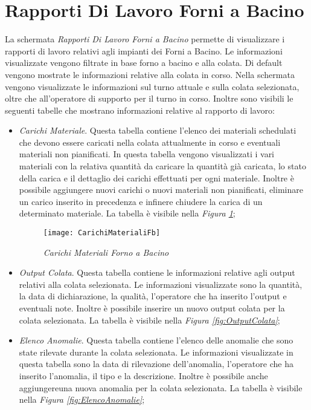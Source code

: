   \section{Rapporti Di Lavoro Forni a Bacino}
  La schermata \textit{Rapporti Di Lavoro Forni a Bacino} permette di visualizzare
  i rapporti di lavoro relativi agli impianti dei Forni a Bacino. Le informazioni visualizzate vengono filtrate in base 
  forno a bacino e alla colata. Di default vengono mostrate le informazioni relative alla colata in corso.
  Nella schermata vengono visualizzate le informazioni sul turno attuale e sulla colata selezionata, oltre che all'operatore
  di supporto per il turno in corso. Inoltre sono visibili le seguenti tabelle che mostrano informazioni relative al 
  rapporto di lavoro:
  \begin{itemize}
    \item \textit{Carichi Materiale}. Questa tabella contiene l'elenco dei materiali schedulati che devono essere caricati nella
    colata attualmente in corso e eventuali materiali non pianificati. In questa tabella vengono visualizzati i vari materiali
    con la relativa quantità da caricare la quantità già caricata, lo stato della carica e il dettaglio dei carichi effettuati
    per ogni materiale. Inoltre è possibile aggiungere nuovi carichi o nuovi materiali non pianificati, eliminare un carico
    inserito in precedenza e infinere chiudere la carica di un determinato materiale. La tabella è visibile nella
    \textit{Figura \ref{fig:CarichiMaterialiFb}};

    \begin{figure}[H]
      \texttt{[image: CarichiMaterialiFb]}
      \centering
      \caption{\textit{Carichi Materiali Forno a Bacino}}
      \label{fig:CarichiMaterialiFb}
    \end{figure}

    \item \textit{Output Colata}. Questa tabella contiene le informazioni relative agli output relativi alla colata selezionata.
    Le informazioni visualizzate sono la quantità, la data di dichiarazione, la qualità, l'operatore che ha inserito l'output
    e eventuali note. Inoltre è possibile inserire un nuovo output colata per la colata selezionata. La tabella è visibile 
    nella \textit{Figura \ref{fig:OutputColata}};

    \item \textit{Elenco Anomalie}. Questa tabella contiene l'elenco delle anomalie che sono state rilevate durante la colata
    selezionata. Le informazioni visualizzate in questa tabella sono la data di rilevazione dell'anomalia, l'operatore che
    ha inserito l'anomalia, il tipo e la descrizione. Inoltre è possibile anche aggiungereuna nuova anomalia per la
    colata selezionata. La tabella è visibile nella \textit{Figura \ref{fig:ElencoAnomalie}};


\end{itemize}
